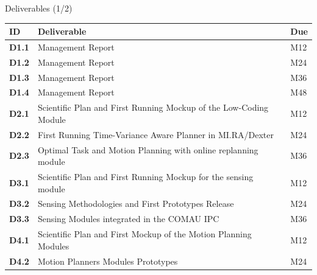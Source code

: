 \documentclass[aspectratio=169,10pt]{beamer}
\begin{document}
\begin{frame}{Deliverables (1/2)}

\scriptsize
\begin{tabularx}{\textwidth}{>{\bfseries}p{} X p{}}
\toprule
ID & Deliverable & Due \\
\midrule
D1.1 & Management Report & M12 \\
D1.2 & Management Report & M24 \\
D1.3 & Management Report & M36 \\
D1.4 & Management Report & M48 \\
D2.1 & Scientific Plan and First Running Mockup of the Low-Coding Module & M12 \\
D2.2 & First Running Time-Variance Aware Planner in MI.RA/Dexter & M24 \\
D2.3 & Optimal Task and Motion Planning with online replanning module & M36 \\
D3.1 & Scientific Plan and First Running Mockup for the sensing module & M12 \\
D3.2 & Sensing Methodologies and First Prototypes Release & M24 \\
D3.3 & Sensing Modules integrated in the COMAU IPC & M36 \\
D4.1 & Scientific Plan and First Mockup of the Motion Planning Modules & M12 \\
D4.2 & Motion Planners Modules Prototypes & M24 \\
\bottomrule
\end{tabularx}

\end{frame}
\end{document}
